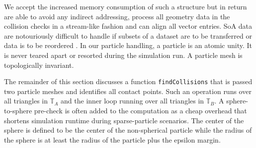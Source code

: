 We accept the increased memory consumption of such a structure but in return are
able to avoid any indirect addressing, process all geometry data in the
collision checks in a stream-like fashion and can align all vector entries. 
SoA data are notouriously difficult to handle if subsets of a dataset are to be
transferred or data is to be reordered \cite{Eichenberger2004}.
In our particle handling, a particle is an atomic unity.
It is never teared apart or resorted during the simulation run.
A particle mesh is topologically invariant.

The remainder of this section discusses a function \texttt{findCollisions} that
is passed two particle meshes and identifies all
contact points. Such an operation runs over all triangles in $\mathbb{T}_A$ and the inner loop running over all triangles in $\mathbb{T}_B$. A sphere-to-sphere pre-check is often added to the computation as a cheap overhead that shortens simulation runtime during sparse-particle scenarios. The center of the sphere is defined to be the center of the non-spherical particle while the radius of the sphere is at least the radius of the particle plus the epsilon margin. 





